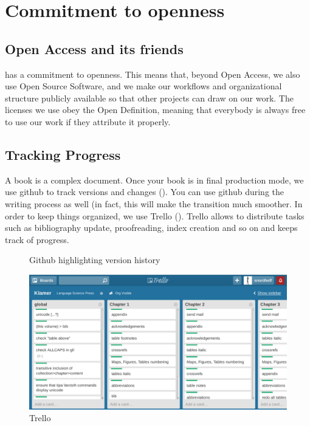\chapter{Commitment to openness}
\section{Open Access and its friends}
\lsp has a commitment to openness. This means that, beyond Open Access, we also use Open Source Software, and we make our workflows and organizational structure publicly available so that other projects can draw on our work. The licenses we use obey the Open Definition, meaning that everybody is always free to use our work if they attribute it properly.




\section{Tracking Progress}
A book is a complex document. Once your book is in final production mode, we use github to track versions and changes (). You can use github during the writing process as well (in fact, this will make the transition much smoother. In order to keep things organized, we use Trello (). Trello allows to distribute tasks such as bibliography update, proofreading, index creation and so on and keeps track of progress.

\begin{figure}
\caption{Github highlighting version history}
\label{fig:latex:github}
\end{figure}

\begin{figure}
\caption{Trello}
\label{fig:latex:trello}
 \includegraphics[width=\textwidth]{trello.png}
\end{figure}

